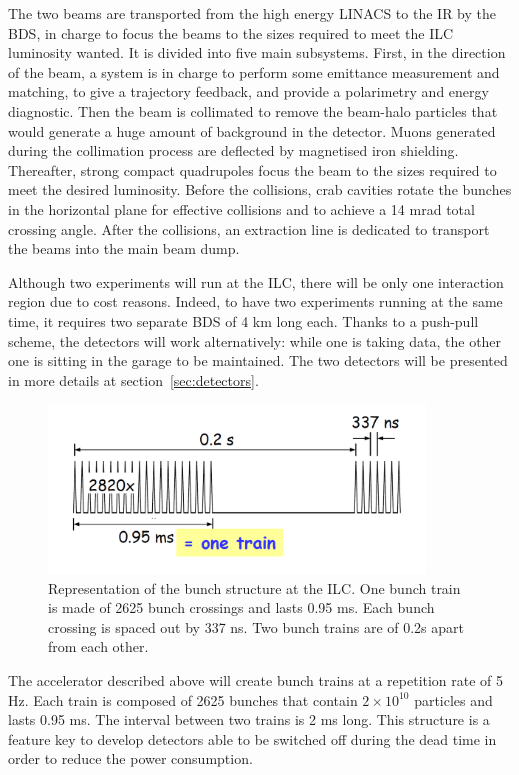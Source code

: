     The two beams are transported from the high energy LINACS to the \gls{IR} by the \gls{BDS}, in charge to focus the beams to the sizes required to meet the \gls{ILC} luminosity wanted.
    It is divided into five main subsystems. 
    First, in the direction of the beam, a system is in charge to perform some emittance measurement and matching, to give a trajectory feedback, and provide a polarimetry and energy diagnostic. 
    Then the beam is collimated to remove the beam-halo particles that would generate a huge amount of background in the detector.
    Muons generated during the collimation process are deflected by magnetised iron shielding.
    Thereafter, strong compact quadrupoles focus the beam to the sizes required to meet the desired luminosity. 
    Before the collisions, crab cavities rotate the bunches in the horizontal plane for effective collisions and to achieve a 14 mrad total crossing angle.
    After the collisions, an extraction line is dedicated to transport the beams into the main beam dump.

    Although two experiments will run at the \gls{ILC}, there will be only one interaction region due to cost reasons.
    Indeed, to have two experiments running at the same time, it requires two separate \gls{BDS} of 4 km long each.
    Thanks to a push-pull scheme, the detectors will work alternatively: while one is taking data, the other one is sitting in the garage to be maintained.
    The two detectors will be presented in more details at section~\ref{sec:detectors}.
    
    \begin{figure}[!h]
      \centering
      \includegraphics[width = 10cm]{Pictures/ILC/bunch.png}
      \caption{Representation of the bunch structure at the ILC. One bunch train is made of 2625 bunch crossings and lasts 0.95 ms. Each bunch crossing is spaced out by 337 ns. Two bunch trains are of 0.2s apart from each other.\cite{Li2010}}
      \label{fig:bunches}
    \end{figure}

    The accelerator described above will create bunch trains at a repetition rate of 5 Hz. 
    Each train is composed of 2625 bunches that contain $2\times 10^{10}$ particles and lasts 0.95 ms. 
    The interval between two trains is 2 ms long. 
    This structure is a feature key to develop detectors able to be switched off during the dead time in order to reduce the power consumption.


